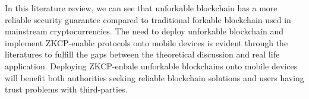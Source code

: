 \documentclass[12pt]{article}
\begin{document}
In this literature review, we can see that unforkable blockchain has a more reliable security guarantee compared to traditional forkable blockchain used in mainstream cryptocurrencies. The need to deploy unforkable blockchain and implement ZKCP-enable protocols onto mobile devices is evident through the literatures to fulfill the gaps between the theoretical discussion and real life application. Deploying ZKCP-enbale unforkable blockchains onto mobile devices will benefit both authorities seeking reliable blockchain solutions and users having trust problems with third-parties.

\newpage


\end{document}
